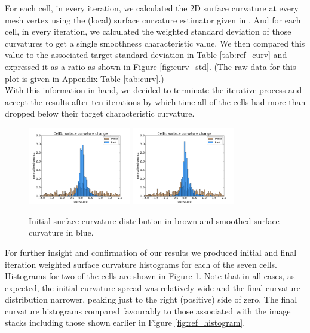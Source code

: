 \documentclass[a4paper,10pt]{article}
\begin{document}
For each cell, in every iteration, we calculated the 2D surface curvature at every mesh vertex using the (local) surface curvature estimator given in \cite{Rugis_2008_DSC}. And for each cell, in every iteration, we calculated the weighted standard deviation of those curvatures to get a single smoothness characteristic value. We then compared this value to the associated target standard deviation in Table \ref{tab:ref_curv} and expressed it as a ratio as shown in Figure \ref{fig:curv_std}. (The raw data for this plot is given in Appendix Table \ref{tab:curv}.)\\

With this information in hand, we decided to terminate the iterative process and accept the results after ten iterations by which time all of the cells had more than dropped below their target characteristic curvature.\\

\begin{figure}[H]
\begin{center}
\includegraphics[width=0.4\textwidth]{images/cell1_curv_morph.pdf}
\includegraphics[width=0.4\textwidth]{images/cell4_curv_morph.pdf}
\end{center}
\caption{Initial surface curvature distribution in brown and smoothed surface curvature in blue.}
\label{fig:morph_histogram}
\end{figure}

For further insight and confirmation of our results we produced initial and final iteration weighted surface curvature histograms for each of the seven cells. Histograms for two of the cells are shown in Figure \ref{fig:morph_histogram}. Note that in all cases, as expected, the initial curvature spread was relatively wide and the final curvature distribution narrower, peaking just to the right (positive) side of zero. The final curvature histograms compared favourably to those associated with the image stacks including those shown earlier in Figure \ref{fig:ref_histogram}.\\
\end{document}
